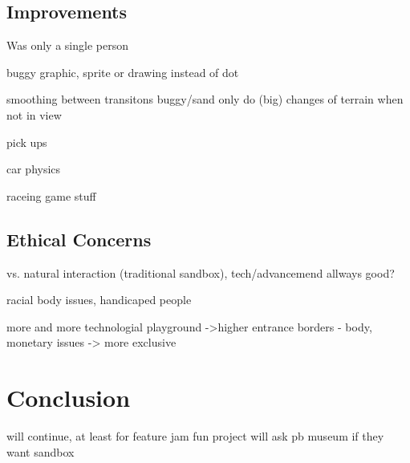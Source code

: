 \documentclass[12pt,a4paper,twoside,titlepage,headsepline,numbers=noenddot,listof=totoc,index=totoc,bibliography=totoc]{scrartcl}
\theoremstyle{break}
\begin{document}
\subsection{Improvements}
Was only a single person

buggy graphic, sprite or drawing instead of dot

smoothing between transitons buggy/sand
only do (big) changes of terrain when not in view

pick ups

car physics

raceing game stuff 


\subsection{Ethical Concerns}
vs. natural interaction (traditional sandbox), tech/advancemend allways good?

racial body issues, handicaped people

more and more technologial playground ->higher entrance borders - body, monetary issues -> more exclusive 


\section{Conclusion}

will continue, at least for feature jam
fun project
will ask pb museum if they want sandbox


\end{document}
